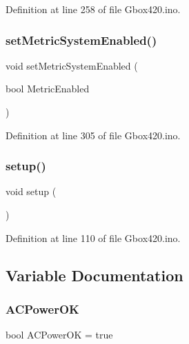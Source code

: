 Definition at line 258 of file Gbox420.\+ino.

\mbox{\label{_gbox420_8ino_a0a334a3bfc5a85501fdba63a77747000}} 
\subsubsection{\texorpdfstring{setMetricSystemEnabled()}{setMetricSystemEnabled()}}
{\footnotesize\ttfamily void set\+Metric\+System\+Enabled (\begin{DoxyParamCaption}\item[{bool}]{Metric\+Enabled }\end{DoxyParamCaption})}



Definition at line 305 of file Gbox420.\+ino.

\mbox{\label{_gbox420_8ino_a4fc01d736fe50cf5b977f755b675f11d}} 
\subsubsection{\texorpdfstring{setup()}{setup()}}
{\footnotesize\ttfamily void setup (\begin{DoxyParamCaption}{ }\end{DoxyParamCaption})}



Definition at line 110 of file Gbox420.\+ino.



\subsection{Variable Documentation}
\mbox{\label{_gbox420_8ino_ac3799863ce8f64dd974ccdc524f04369}} 
\subsubsection{\texorpdfstring{ACPowerOK}{ACPowerOK}}
{\footnotesize\ttfamily bool A\+C\+Power\+OK = true}




